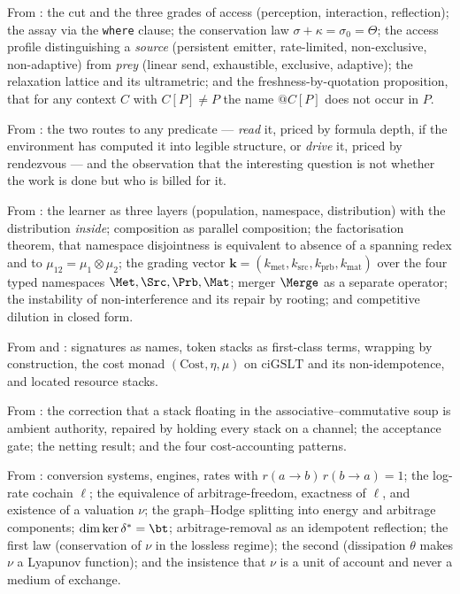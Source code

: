 From \chSci: the cut and the three grades of access (perception,
interaction, reflection); the assay via the \texttt{where} clause; the
conservation law $\sigma + \kappa = \sigma_0 = \Theta$; the access profile
distinguishing a \emph{source} (persistent emitter, rate-limited,
non-exclusive, non-adaptive) from \emph{prey} (linear send, exhaustible,
exclusive, adaptive); the relaxation lattice and its ultrametric; and the
freshness-by-quotation proposition, that for any context $C$ with
$C[P] \neq P$ the name $@C[P]$ does not occur in $P$.

From \chGame: the two routes to any predicate --- \emph{read} it,
priced by formula depth, if the environment has computed it into legible
structure, or \emph{drive} it, priced by rendezvous --- and the observation
that the interesting question is not whether the work is done but who is
billed for it.

From \chComp: the learner as three layers (population, namespace,
distribution) with the distribution \emph{inside}; composition as parallel
composition; the factorisation theorem, that namespace disjointness is
equivalent to absence of a spanning redex and to $\mu_{12} =
\mu_1 \otimes \mu_2$; the grading vector
$\mathbf{k} = (k_{\mathrm{met}}, k_{\mathrm{src}}, k_{\mathrm{prb}},
k_{\mathrm{mat}})$ over the four typed namespaces $\Met, \Src, \Prb, \Mat$;
merger $\Merge$ as a separate operator; the instability of non-interference
and its repair by rooting; and competitive dilution in closed form.

From \cite{CARho} and \cite{CE}: signatures as names, token stacks as
first-class terms, wrapping by construction, the cost monad
$(\mathrm{Cost}, \eta, \mu)$ on $\mathrm{ciGSLT}$ and its non-idempotence,
and located resource stacks.

From \cite{finrho}: the correction that a stack floating in the
associative--commutative soup is ambient authority, repaired by holding
every stack on a channel; the acceptance gate; the netting result; and the
four cost-accounting patterns.

From \cite{vtok}: conversion systems, engines, rates with
$r(a{\to}b)\,r(b{\to}a) = 1$; the log-rate cochain $\ell$; the equivalence
of arbitrage-freedom, exactness of $\ell$, and existence of a valuation
$\nu$; the graph--Hodge splitting into energy and arbitrage components;
$\dim\ker\delta^\ast = \bt$; arbitrage-removal as an idempotent reflection;
the first law (conservation of $\nu$ in the lossless regime); the second
(dissipation $\theta$ makes $\nu$ a Lyapunov function); and the insistence
that $\nu$ is a unit of account and never a medium of exchange.

